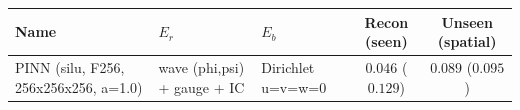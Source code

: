 \begin{center}
\begin{tabular}{lll cc}
\toprule
Name & $E_r$ & $E_b$ & Recon (seen) & Unseen (spatial) \\
\midrule
PINN (silu, F256, 256x256x256, a=1.0) & wave (phi,psi) + gauge + IC & Dirichlet u=v=w=0 & $0.046$ ($0.129$) & $0.089$ ($0.095$) \\
\bottomrule
\end{tabular}
\end{center}
